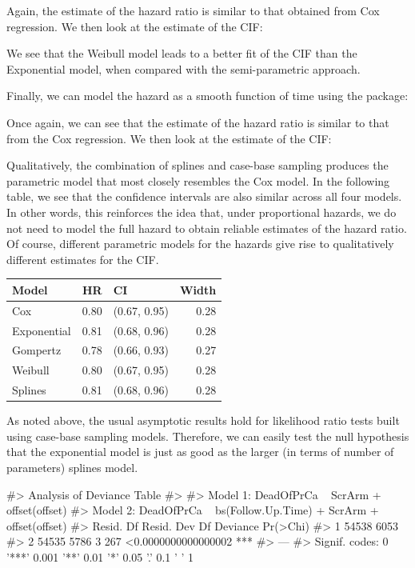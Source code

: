 \documentclass[
]{jss}
\begin{document}
Again, the estimate of the hazard ratio is similar to that obtained from
Cox regression. We then look at the estimate of the CIF:

We see that the Weibull model leads to a better fit of the CIF than the
Exponential model, when compared with the semi-parametric approach.

Finally, we can model the hazard as a smooth function of time using the
 package:

Once again, we can see that the estimate of the hazard ratio is similar
to that from the Cox regression. We then look at the estimate of the
CIF:

Qualitatively, the combination of splines and case-base sampling
produces the parametric model that most closely resembles the Cox model.
In the following table, we see that the confidence intervals are also
similar across all four models. In other words, this reinforces the idea
that, under proportional hazards, we do not need to model the full
hazard to obtain reliable estimates of the hazard ratio. Of course,
different parametric models for the hazards give rise to qualitatively
different estimates for the CIF.

\begin{CodeChunk}
\begin{table}[H]
\centering
\begin{tabular}{lrlr}
\toprule
Model & HR & CI & Width\\
\midrule
Cox & 0.80 & (0.67, 0.95) & 0.28\\
Exponential & 0.81 & (0.68, 0.96) & 0.28\\
Gompertz & 0.78 & (0.66, 0.93) & 0.27\\
Weibull & 0.80 & (0.67, 0.95) & 0.28\\
Splines & 0.81 & (0.68, 0.96) & 0.28\\
\bottomrule
\end{tabular}
\end{table}

\end{CodeChunk}

As noted above, the usual asymptotic results hold for likelihood ratio
tests built using case-base sampling models. Therefore, we can easily
test the null hypothesis that the exponential model is just as good as
the larger (in terms of number of parameters) splines model.

\begin{CodeChunk}

\begin{CodeOutput}
#> Analysis of Deviance Table
#> 
#> Model 1: DeadOfPrCa ~ ScrArm + offset(offset)
#> Model 2: DeadOfPrCa ~ bs(Follow.Up.Time) + ScrArm + offset(offset)
#>   Resid. Df Resid. Dev Df Deviance            Pr(>Chi)    
#> 1     54538       6053                                    
#> 2     54535       5786  3      267 <0.0000000000000002 ***
#> ---
#> Signif. codes:  0 '***' 0.001 '**' 0.01 '*' 0.05 '.' 0.1 ' ' 1
\end{CodeOutput}
\end{CodeChunk}
\end{document}
